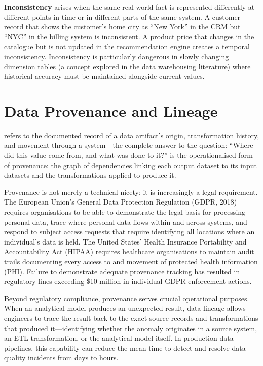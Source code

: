 \textbf{Inconsistency} arises when the same real-world fact is
represented differently at different points in time or in different
parts of the same system. A customer record that shows the customer's
home city as ``New York'' in the CRM but ``NYC'' in the billing system
is inconsistent. A product price that changes in the catalogue but is
not updated in the recommendation engine creates a temporal
inconsistency. Inconsistency is particularly dangerous in slowly
changing dimension tables (a concept explored in the data warehousing
literature) where historical accuracy must be maintained alongside
current values.

\section{Data Provenance and Lineage}
\label{sec:provenance}

 refers to the documented record of a data
artifact's origin, transformation history, and movement through a
system---the complete answer to the question: ``Where did this value
come from, and what was done to it?''  is the
operationalised form of provenance: the graph of dependencies linking
each output dataset to its input datasets and the transformations
applied to produce it.

Provenance is not merely a technical nicety; it is increasingly a
legal requirement. The European Union's General Data Protection
Regulation (GDPR, 2018) requires organisations to be able to demonstrate
the legal basis for processing personal data, trace where personal data
flows within and across systems, and respond to subject access requests
that require identifying all locations where an individual's data is
held. The United States' Health Insurance Portability and
Accountability Act (HIPAA) requires healthcare organisations to maintain
audit trails documenting every access to and movement of protected
health information (PHI). Failure to demonstrate adequate provenance
tracking has resulted in regulatory fines exceeding \$10 million in
individual GDPR enforcement actions.

Beyond regulatory compliance, provenance serves crucial operational
purposes. When an analytical model produces an unexpected result, data
lineage allows engineers to trace the result back to the exact source
records and transformations that produced it---identifying whether the
anomaly originates in a source system, an ETL transformation, or the
analytical model itself. In production data pipelines, this capability
can reduce the mean time to detect and resolve data quality incidents
from days to hours.

